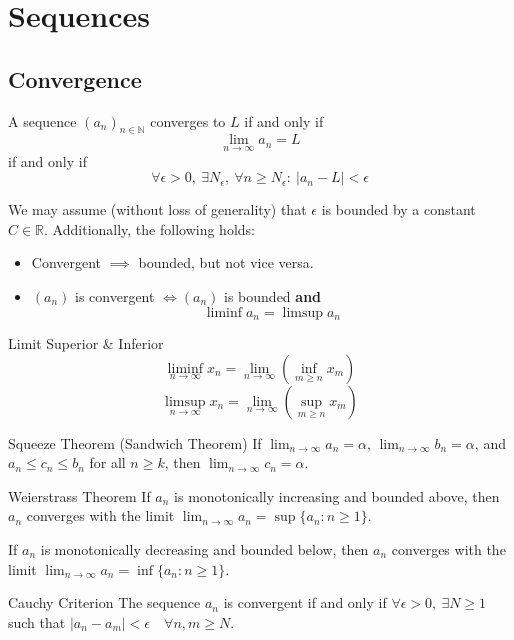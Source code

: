 \section{Sequences}
\subsection{Convergence}
A sequence $(a_n)_{n\in \mathbb{N}}$ converges to \( L \) if and only if 
\[ \lim_{n \to \infty} a_n = L \] 
if and only if 
\[ \forall \epsilon > 0, \ \exists N_\epsilon, \ \forall n \ge N_\epsilon : \ | a_n - L | < \epsilon \]

We may assume (without loss of generality) that \( \epsilon \) is bounded by a constant \( C \in \mathbb{R} \).
Additionally, the following holds:
\begin{itemize}
 \item Convergent \( \implies \) bounded, but not vice versa.
 \item \( (a_n) \) is convergent \( \iff (a_n) \) is bounded \textbf{and} \[ \liminf a_n = \limsup a_n \]
\end{itemize}

\begin{subbox}{Limit Superior \& Inferior}
\[
\liminf_{n \to \infty} x_n = \lim_{n \to \infty} \left( \inf_{m \ge n} x_m \right)
\]
\[
\limsup_{n \to \infty} x_n = \lim_{n \to \infty} \left( \sup_{m \ge n} x_m \right)
\]
\end{subbox}

\begin{mainbox}{Squeeze Theorem (Sandwich Theorem)}
If \(\lim_{n \to \infty} a_n = \alpha\), \(\lim_{n \to \infty} b_n = \alpha\), and \(a_n \leq c_n \leq b_n\) for all \(n \geq k\), then \(\lim_{n \to \infty} c_n = \alpha\).
\end{mainbox}

\begin{mainbox}{Weierstrass Theorem}
If \(a_n\) is monotonically increasing and bounded above, then \(a_n\) converges with the limit \(\lim_{n \to \infty} a_n = \sup \{a_n : n \geq 1\}\).

If \(a_n\) is monotonically decreasing and bounded below, then \(a_n\) converges with the limit \(\lim_{n \to \infty} a_n = \inf \{a_n : n \geq 1\}\).
\end{mainbox}

\begin{mainbox}{Cauchy Criterion}
The sequence \(a_n\) is convergent if and only if \( \forall \epsilon > 0, \ \exists N \ge 1 \) such that \( | a_n - a_m | < \epsilon \quad \forall n,m \ge N \).
\end{mainbox}

